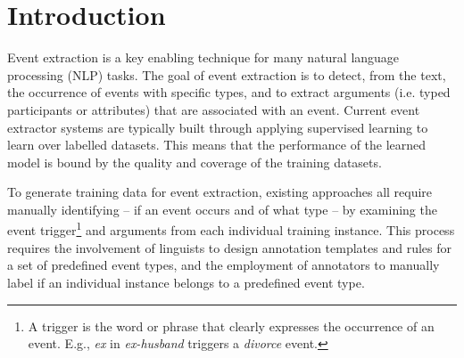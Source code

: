 \section{Introduction}
%

Event extraction is a key enabling technique for many natural language processing (NLP) tasks. The goal of event extraction is to detect,
from the text, the occurrence of events with specific types, and to extract arguments (i.e. typed participants or attributes) that are
associated with an event. Current event extractor systems are typically built through applying supervised learning to learn over labelled
datasets. This means that the performance of the learned model is bound by the quality and coverage of the training datasets.

To generate training data for event extraction, existing approaches all require manually identifying -- if an event occurs and of what type
-- by examining the event trigger\footnote{A trigger is the word or phrase that clearly expresses the occurrence of an event. E.g.,
\textit{ex} in \textit{ex-husband} triggers a \emph{divorce} event.} and arguments from each individual training instance. This process
requires the involvement of linguists to design annotation templates and rules for a set of predefined event types, and the employment of
annotators to manually label if an individual instance belongs to a predefined event type.


